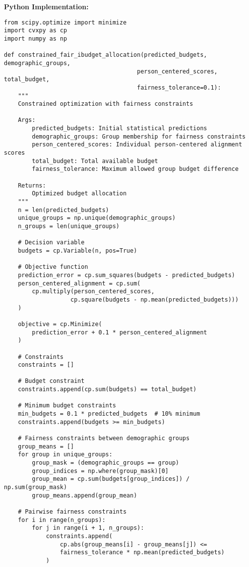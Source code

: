 \documentclass[12pt]{article}
\begin{document}
\textbf{Python Implementation:}
\begin{lstlisting}
from scipy.optimize import minimize
import cvxpy as cp
import numpy as np

def constrained_fair_ibudget_allocation(predicted_budgets, demographic_groups, 
                                      person_centered_scores, total_budget,
                                      fairness_tolerance=0.1):
    """
    Constrained optimization with fairness constraints
    
    Args:
        predicted_budgets: Initial statistical predictions
        demographic_groups: Group membership for fairness constraints
        person_centered_scores: Individual person-centered alignment scores
        total_budget: Total available budget
        fairness_tolerance: Maximum allowed group budget difference
    
    Returns:
        Optimized budget allocation
    """
    n = len(predicted_budgets)
    unique_groups = np.unique(demographic_groups)
    n_groups = len(unique_groups)
    
    # Decision variable
    budgets = cp.Variable(n, pos=True)
    
    # Objective function
    prediction_error = cp.sum_squares(budgets - predicted_budgets)
    person_centered_alignment = cp.sum(
        cp.multiply(person_centered_scores, 
                   cp.square(budgets - np.mean(predicted_budgets)))
    )
    
    objective = cp.Minimize(
        prediction_error + 0.1 * person_centered_alignment
    )
    
    # Constraints
    constraints = []
    
    # Budget constraint
    constraints.append(cp.sum(budgets) == total_budget)
    
    # Minimum budget constraints
    min_budgets = 0.1 * predicted_budgets  # 10% minimum
    constraints.append(budgets >= min_budgets)
    
    # Fairness constraints between demographic groups
    group_means = []
    for group in unique_groups:
        group_mask = (demographic_groups == group)
        group_indices = np.where(group_mask)[0]
        group_mean = cp.sum(budgets[group_indices]) / np.sum(group_mask)
        group_means.append(group_mean)
    
    # Pairwise fairness constraints
    for i in range(n_groups):
        for j in range(i + 1, n_groups):
            constraints.append(
                cp.abs(group_means[i] - group_means[j]) <= 
                fairness_tolerance * np.mean(predicted_budgets)
            )
    

\end{lstlisting}
\end{document}
